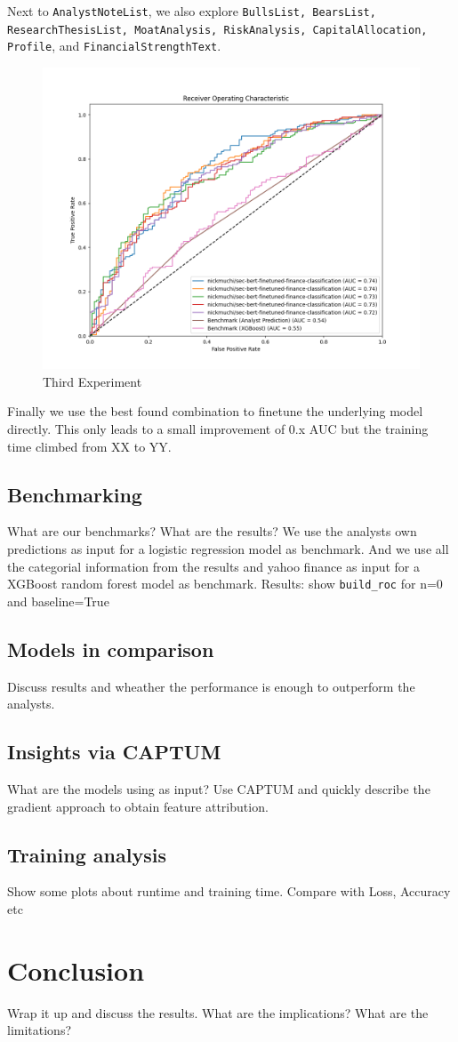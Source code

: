 \documentclass[conference]{IEEEtran}
\begin{document}
Next to \texttt{AnalystNoteList}, we also explore 
\texttt{BullsList, BearsList, ResearchThesisList, MoatAnalysis, RiskAnalysis, CapitalAllocation, Profile}, and  \texttt{FinancialStrengthText}.

\begin{figure}[h!]
    \centering
    \includegraphics[width=.65\linewidth]{../3. evaluation/roc_curves/top_5_models_2024-04-25_01-52-12.png}
    \caption[Third Experiment]{Third Experiment}
    \label{fig:Thirdexp}
\end{figure}

Finally we use the best found combination to finetune the underlying model directly. This only leads to a small improvement of 0.x AUC but the training time climbed from XX to YY.

\subsection{Benchmarking}%
What are our benchmarks? What are the results?
We use the analysts own predictions as input for a logistic regression model as benchmark.
And we use all the categorial information from the results and yahoo finance as input for a XGBoost random forest model as benchmark.
Results: show \texttt{build\_roc} for n=0 and baseline=True

\subsection{Models in comparison}%
Discuss results and wheather the performance is enough to outperform the analysts.

\subsection{Insights via CAPTUM}%
What are the models using as input? Use CAPTUM and quickly describe the gradient approach to obtain feature attribution.


\subsection{Training analysis}%
Show some plots about runtime and training time. Compare with Loss, Accuracy etc

\section{Conclusion}
Wrap it up and discuss the results. What are the implications? What are the limitations?


\end{document}
